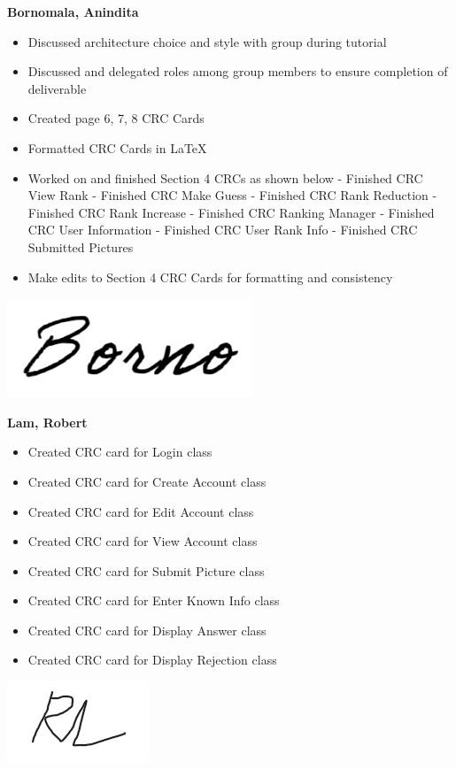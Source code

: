 \documentclass[]{article}
\begin{document}
\textbf{Bornomala, Anindita}
\begin{itemize}
        \item Discussed architecture choice and style with group during tutorial
        \item Discussed and delegated roles among group members to ensure completion of deliverable
        \item Created page 6, 7, 8 CRC Cards
		\item Formatted CRC Cards in LaTeX
		\item Worked on and finished Section 4 CRCs as shown below
            \subitem - Finished CRC View Rank
            \subitem - Finished CRC Make Guess
            \subitem - Finished CRC Rank Reduction
            \subitem - Finished CRC Rank Increase
            \subitem - Finished CRC Ranking Manager
			\subitem - Finished CRC User Information
			\subitem - Finished CRC User Rank Info
			\subitem - Finished CRC Submitted Pictures
		\item Make edits to Section 4 CRC Cards for formatting and consistency

\end{itemize}
\includegraphics[scale=0.50]{bornosignature.png}

\textbf{Lam, Robert}
\begin{itemize}
        \item Created CRC card for Login class
		\item Created CRC card for Create Account class
		\item Created CRC card for Edit Account class
		\item Created CRC card for View Account class
		\item Created CRC card for Submit Picture class
		\item Created CRC card for Enter Known Info class
		\item Created CRC card for Display Answer class
		\item Created CRC card for Display Rejection class
\end{itemize}
\includegraphics[scale=1]{robertsignature.png}

\end{document}
